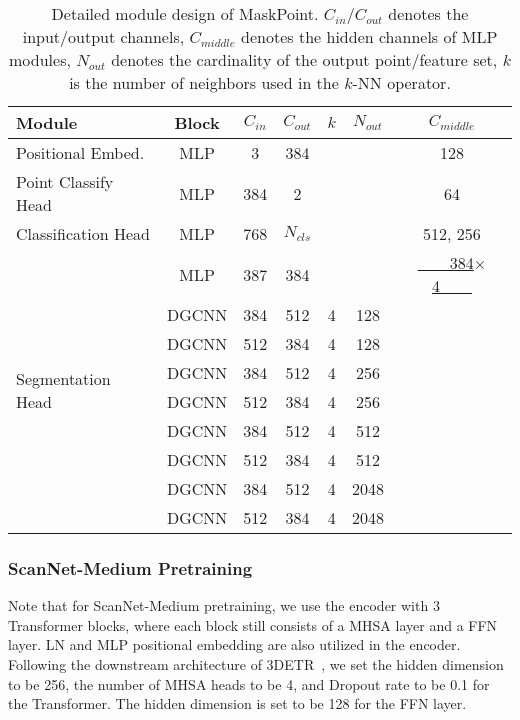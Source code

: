 \documentclass[runningheads]{llncs}
\begin{document}
\begin{table}[t]
    \tabcolsep=0.2cm
    \centering
\begin{tabular}{l|c|c|c|c|c|c}
\toprule
Module & Block & $C_{in}$ & $C_{out}$ & $k$ & $N_{out}$ & $C_{middle}$ \\
\midrule
Positional Embed. & MLP & 3 & 384 & & & 128 \\
\midrule
Point Classify Head & MLP & 384 & 2 & & & 64 \\
\midrule
Classification Head & MLP & 768 & $N_{cls}$ & & & 512, 256 \\
\midrule
\multirow{9}{*}{Segmentation Head} & MLP & 387 & 384 & & & \underline{~~~~384$\times$4~~~~}  \\
& DGCNN & 384 & 512 & 4 & 128 & \\
& DGCNN & 512 & 384 & 4 & 128 & \\
& DGCNN & 384 & 512 & 4 & 256 & \\
& DGCNN & 512 & 384 & 4 & 256 & \\
& DGCNN & 384 & 512 & 4 & 512 & \\
& DGCNN & 512 & 384 & 4 & 512 & \\
& DGCNN & 384 & 512 & 4 & 2048 & \\
& DGCNN & 512 & 384 & 4 & 2048 & \\
\bottomrule
\end{tabular}
    \caption{Detailed module design of MaskPoint.  $C_{in}/C_{out}$ denotes the input/output channels, $C_{middle}$ denotes the hidden channels of MLP modules, $N_{out}$ denotes the cardinality of the output point/feature set, $k$ is the number of neighbors used in the $k$-NN operator.}
    \label{tab:detail_design_config}
    \vspace{-8pt}
\end{table}

\vspace{-10pt}
\subsubsection{ScanNet-Medium Pretraining}

Note that for ScanNet-Medium pretraining, we use the encoder with 3 Transformer blocks, where each block still consists of a MHSA layer and a FFN layer. LN and MLP positional embedding are also utilized in the encoder. Following the downstream architecture of 3DETR~\cite{misra2021-3detr}, we set the hidden dimension to be 256, the number of MHSA heads to be 4, and Dropout rate to be 0.1 for the Transformer. The hidden dimension is set to be 128 for the FFN layer. 
\end{document}
